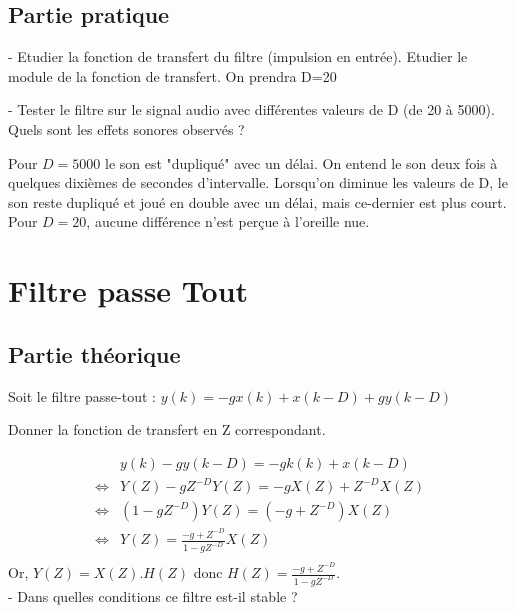 \clearpage

\subsection{Partie pratique}

- Etudier la fonction de transfert du filtre (impulsion en entrée). Etudier le module de la fonction de transfert. On prendra D=20

- Tester le filtre sur le signal audio avec différentes valeurs de D (de 20 à 5000). Quels sont les effets sonores observés ?

Pour $D = 5000$ le son est "dupliqué" avec un délai. On entend le son deux fois à quelques dixièmes de secondes d'intervalle. Lorsqu'on diminue les valeurs de D, le son reste dupliqué et joué en double avec un délai, mais ce-dernier est plus court. Pour $D = 20$, aucune différence n'est perçue à l'oreille nue.

\section{Filtre passe Tout}

\subsection{Partie théorique}

Soit le filtre passe-tout : $y(k) = −gx(k) + x(k − D) + gy(k − D)$

Donner la fonction de transfert en Z correspondant.

\begin{align*}
  &y(k) - gy(k - D) = -gk(k) + x(k - D)\\
  \iff &Y(Z) - gZ^{-D}Y(Z) = -gX(Z) + Z^{-D}X(Z)\\
  \iff &(1 - gZ^{-D})Y(Z) = (-g + Z^{-D})X(Z)\\
  \iff &Y(Z) = \frac{-g + Z^{-D}}{1 - gZ^{-D}}X(Z)\\
\end{align*}
Or, $Y(Z) = X(Z).H(Z)$ donc $H(Z) = \frac{-g + Z^{-D}}{1 - gZ^{-D}}$.\\


- Dans quelles conditions ce filtre est-il stable ?


